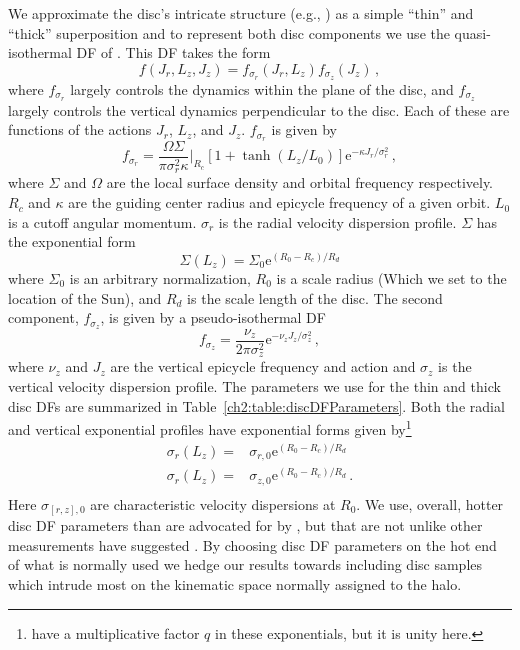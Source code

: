 We approximate the disc's intricate structure (e.g., \textcite{bovy12d}) as a simple ``thin'' and ``thick'' superposition and to represent both disc components we use the quasi-isothermal DF of \textcite{binney11} \parencite[see also ][]{binney10}. This DF takes the form
\begin{equation}
    f(J_{r},L_{z},J_{z}) = f_{\sigma_{r}}(J_{r},L_{z})f_{\sigma_{z}}(J_{z})\,,
\end{equation}
where $f_{\sigma_{r}}$ largely controls the dynamics within the plane of the disc, and $f_{\sigma_{z}}$ largely controls the vertical dynamics perpendicular to the disc. Each of these are functions of the actions $J_{r}$, $L_{z}$, and $J_{z}$. $f_{\sigma_{r}}$ is given by
\begin{equation}
    f_{\sigma_{r}} = \frac{\Omega \Sigma}{ \pi \sigma_{r}^{2} \kappa } \bigg \rvert_{R_{c}} [1 + \tanh(L_{z}/L_{0})] \mathrm{e}^{-\kappa J_{r} / \sigma_{r}^{2}}\,,
\end{equation}
where $\Sigma$ and $\Omega$ are the local surface density and orbital frequency respectively. $R_{c}$ and $\kappa$ are the guiding center radius and epicycle frequency of a given orbit. $L_{0}$ is a cutoff angular momentum. $\sigma_{r}$ is the radial velocity dispersion profile. $\Sigma$ has the exponential form
\begin{equation}
    \Sigma(L_{z}) = \Sigma_{0} \mathrm{e}^{(R_{0}-R_{c})/R_{d}}
\end{equation}
where $\Sigma_{0}$ is an arbitrary normalization, $R_{0}$ is a scale radius (Which we set to the location of the Sun), and $R_{d}$ is the scale length of the disc.
The second component, $f_{\sigma_{z}}$, is given by a pseudo-isothermal DF
\begin{equation}
    f_{\sigma_{z}} =  \frac{\nu_{z}}{2\pi \sigma_{z}^{2}} \mathrm{e}^{-\nu_{z} J_{z}/\sigma_{z}^{2}}\,,
\end{equation}
where $\nu_{z}$ and $J_{z}$ are the vertical epicycle frequency and action and $\sigma_{z}$ is the vertical velocity dispersion profile. The parameters we use for the thin and thick disc DFs are summarized in Table~\ref{ch2:table:discDFParameters}. Both the radial and vertical exponential profiles have exponential forms given by\footnote{\textcite{binney11} have a multiplicative factor $q$ in these exponentials, but it is unity here.}
\begin{equation}
    \begin{split}
        \nonumber \sigma_{r}(L_{z}) = & \sigma_{r,0} \mathrm{e}^{(R_{0}-R_{c})/R_{d}} \\
        \sigma_{r}(L_{z}) = & \sigma_{z,0} \mathrm{e}^{(R_{0}-R_{c})/R_{d}}\,. \\
    \end{split}
\end{equation}
Here $\sigma_{[r,z],0}$ are characteristic velocity dispersions at $R_{0}$. We use, overall, hotter disc DF parameters than are advocated for by \textcite{binney11}, but that are not unlike other measurements have suggested \parencite[e.g. ][]{bovy12d,mackereth19b}. By choosing disc DF parameters on the hot end of what is normally used we hedge our results towards including disc samples which intrude most on the kinematic space normally assigned to the halo.

